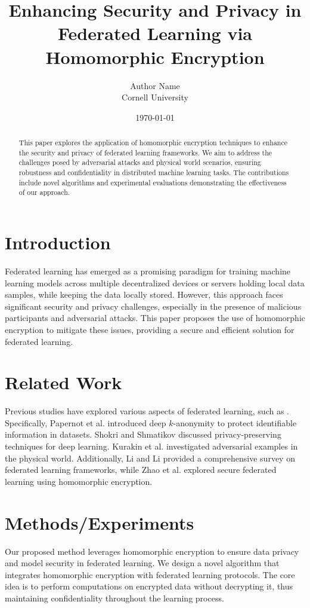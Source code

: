 \documentclass{article}
\title{Enhancing Security and Privacy in Federated Learning via Homomorphic Encryption}
\author{Author Name \\ Cornell University}
\date{\today}
\begin{document}
\maketitle

\begin{abstract}
This paper explores the application of homomorphic encryption techniques to enhance the security and privacy of federated learning frameworks. We aim to address the challenges posed by adversarial attacks and physical world scenarios, ensuring robustness and confidentiality in distributed machine learning tasks. The contributions include novel algorithms and experimental evaluations demonstrating the effectiveness of our approach.
\end{abstract}

\section{Introduction}
Federated learning has emerged as a promising paradigm for training machine learning models across multiple decentralized devices or servers holding local data samples, while keeping the data locally stored. However, this approach faces significant security and privacy challenges, especially in the presence of malicious participants and adversarial attacks. This paper proposes the use of homomorphic encryption to mitigate these issues, providing a secure and efficient solution for federated learning.

\section{Related Work}
Previous studies have explored various aspects of federated learning, such as \cite{Papernot2017DeepKA, Shokri2015PrivacyPreservingDL, Kurakin2017AdversarialExamples}. Specifically, Papernot et al. \cite{Papernot2017DeepKA} introduced deep $k$-anonymity to protect identifiable information in datasets. Shokri and Shmatikov \cite{Shokri2015PrivacyPreservingDL} discussed privacy-preserving techniques for deep learning. Kurakin et al. \cite{Kurakin2017AdversarialExamples} investigated adversarial examples in the physical world. Additionally, Li and Li \cite{Li2019ASurvey} provided a comprehensive survey on federated learning frameworks, while Zhao et al. \cite{Zhao2020SecureAndEfficient} explored secure federated learning using homomorphic encryption.

\section{Methods/Experiments}
Our proposed method leverages homomorphic encryption to ensure data privacy and model security in federated learning. We design a novel algorithm that integrates homomorphic encryption with federated learning protocols. The core idea is to perform computations on encrypted data without decrypting it, thus maintaining confidentiality throughout the learning process.
\end{document}
